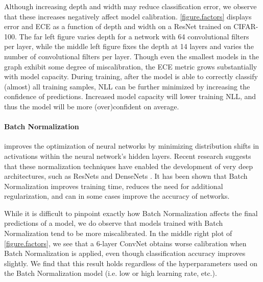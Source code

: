 Although increasing depth and width may reduce classification error, we observe that these increases negatively affect model calibration.
\autoref{figure.factors} displays error and ECE as a function of depth and width on a ResNet trained on CIFAR-100. The far left figure varies depth for a network with 64 convolutional filters per layer, while the middle left figure fixes the depth at 14 layers and varies the number of convolutional filters per layer. Though even the smallest models in the graph exhibit some degree of miscalibration, the ECE metric grows substantially with model capacity.
During training, after the model is able to correctly classify (almost) all training samples, NLL can be further minimized by increasing the confidence of predictions.
Increased model capacity will lower training NLL, and thus the model will be more (over)confident on average.

\paragraph{Batch Normalization} \cite{ioffe2015batch} improves the optimization of neural networks by minimizing distribution shifts in activations within the neural network's hidden layers. Recent research suggests that these normalization techniques have enabled the development of very deep architectures, such as ResNets \cite{he2015deep} and DenseNets \cite{huang2016densely}. It has been shown that Batch Normalization improves training time, reduces the need for additional regularization, and can in some cases improve the accuracy of networks.

While it is difficult to pinpoint exactly how Batch Normalization affects the final predictions of a model, we do observe that models trained with Batch Normalization tend to be more miscalibrated. In the middle right plot of \autoref{figure.factors}, we see that a 6-layer ConvNet obtains worse calibration when Batch Normalization is applied, even though classification accuracy improves slightly. We find that this result holds regardless of the hyperparameters used on the Batch Normalization model (i.e. low or high learning rate, etc.).

